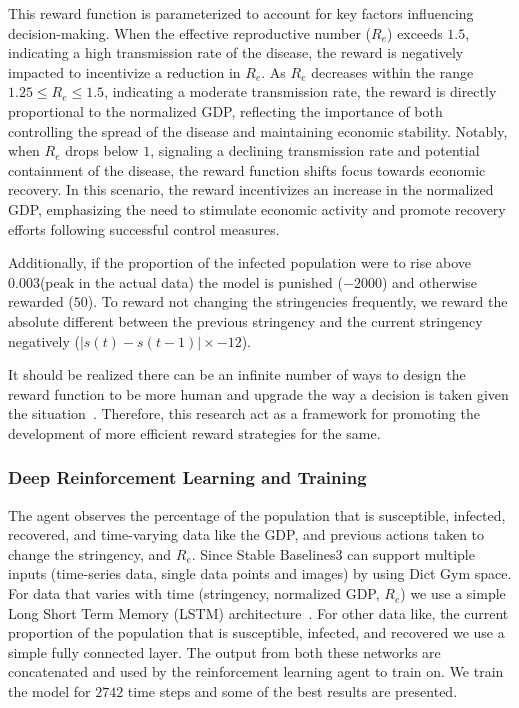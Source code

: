 \documentclass[tikz,fleqn,12pt]{wlscirep}
\begin{document}
This reward function is parameterized to account for key factors influencing decision-making. When the effective reproductive number ($R_e$) exceeds $1.5$, indicating a high transmission rate of the disease, the reward is negatively impacted to incentivize a reduction in $R_e$. As $R_e$ decreases within the range $1.25 \leq R_e \leq 1.5$, indicating a moderate transmission rate, the reward is directly proportional to the normalized GDP, reflecting the importance of both controlling the spread of the disease and maintaining economic stability. Notably, when $R_e$ drops below $1$, signaling a declining transmission rate and potential containment of the disease, the reward function shifts focus towards economic recovery. In this scenario, the reward incentivizes an increase in the normalized GDP, emphasizing the need to stimulate economic activity and promote recovery efforts following successful control measures.

Additionally, if the proportion of the infected population were to rise above 0.003(peak in the actual data) the model is punished ($-2000$) and otherwise rewarded ($50$). To reward not changing the stringencies frequently, we reward the absolute different between the previous stringency and the current stringency negatively ($|s(t) - s(t-1)| \times -12$).

It should be realized there can be an infinite number of ways to design the reward function to be more human and upgrade the way a decision is taken given the situation~\cite{AWSDeepRacer}. Therefore, this research act as a  framework for promoting the development of more efficient reward strategies for the same. 

\subsubsection{Deep Reinforcement Learning and Training}\label{drl_and_training}
The agent observes the percentage of the population that is susceptible, infected, recovered, and time-varying data like the GDP, and previous actions taken to change the stringency, and $R_e$. Since Stable Baselines3 can support multiple inputs (time-series data, single data points and images) by using Dict Gym space. For data that varies with time (stringency, normalized GDP, $R_e$) we use a simple Long Short Term Memory (LSTM) architecture~\cite{LSTM}. For other data like, the current proportion of the population that is susceptible, infected, and recovered we use a simple fully connected layer. The output from both these networks are concatenated and used by the reinforcement learning agent to train on. We train the model for $2742$ time steps and some of the best results are presented.
\end{document}
